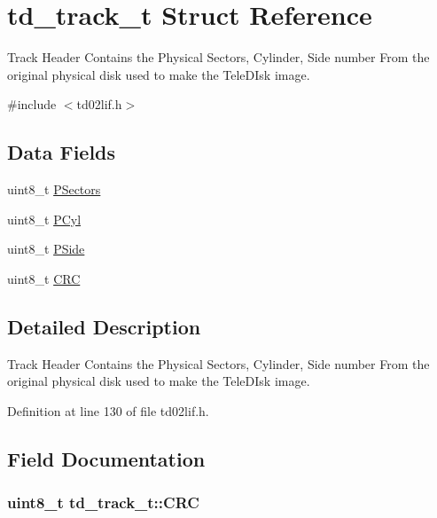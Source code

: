 \hypertarget{structtd__track__t}{}\section{td\+\_\+track\+\_\+t Struct Reference}
\label{structtd__track__t}


Track Header Contains the Physical Sectors, Cylinder, Side number From the original physical disk used to make the Tele\+D\+Isk image.  




{\ttfamily \#include $<$td02lif.\+h$>$}

\subsection*{Data Fields}
\begin{DoxyCompactItemize}
\item 
uint8\+\_\+t \hyperlink{structtd__track__t_a8f8ba7a0392f869f062f46d50a11bdfa}{P\+Sectors}
\item 
uint8\+\_\+t \hyperlink{structtd__track__t_a479a4bf60fcfdcbca513ebdea33b8e8c}{P\+Cyl}
\item 
uint8\+\_\+t \hyperlink{structtd__track__t_af2074402835d514cbf7f5f40e25fa284}{P\+Side}
\item 
uint8\+\_\+t \hyperlink{structtd__track__t_a32523d00c555ab3bc766a585d06ce372}{C\+RC}
\end{DoxyCompactItemize}


\subsection{Detailed Description}
Track Header Contains the Physical Sectors, Cylinder, Side number From the original physical disk used to make the Tele\+D\+Isk image. 

Definition at line 130 of file td02lif.\+h.



\subsection{Field Documentation}
\subsubsection[{\texorpdfstring{C\+RC}{CRC}}]{\setlength{\rightskip}{0pt plus 5cm}uint8\+\_\+t td\+\_\+track\+\_\+t\+::\+C\+RC}\hypertarget{structtd__track__t_a32523d00c555ab3bc766a585d06ce372}{}\label{structtd__track__t_a32523d00c555ab3bc766a585d06ce372}


